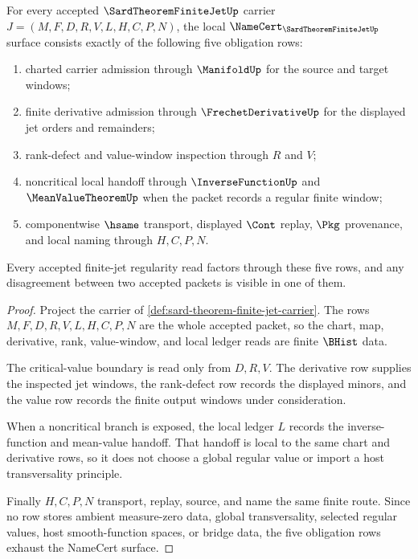 \begin{theorem}
\label{thm:sard-theorem-finite-jet-namecert-obligations}
For every accepted $\SardTheoremFiniteJetUp$ carrier $J=(M,F,D,R,V,L,H,C,P,N)$, the local $\NameCert_{\SardTheoremFiniteJetUp}$ surface consists exactly of the following five obligation rows:
\begin{enumerate}
\item charted carrier admission through $\ManifoldUp$ for the source and target windows;
\item finite derivative admission through $\FrechetDerivativeUp$ for the displayed jet orders and remainders;
\item rank-defect and value-window inspection through $R$ and $V$;
\item noncritical local handoff through $\InverseFunctionUp$ and $\MeanValueTheoremUp$ when the packet records a regular finite window;
\item componentwise $\hsame$ transport, displayed $\Cont$ replay, $\Pkg$ provenance, and local naming through $H,C,P,N$.
\end{enumerate}
Every accepted finite-jet regularity read factors through these five rows, and any disagreement between two accepted packets is visible in one of them.
\end{theorem}
\begin{proof}
Project the carrier of \autoref{def:sard-theorem-finite-jet-carrier}. The rows $M,F,D,R,V,L,H,C,P,N$ are the whole accepted packet, so the chart, map, derivative, rank, value-window, and local ledger reads are finite $\BHist$ data.

The critical-value boundary is read only from $D,R,V$. The derivative row supplies the inspected jet windows, the rank-defect row records the displayed minors, and the value row records the finite output windows under consideration.

When a noncritical branch is exposed, the local ledger $L$ records the inverse-function and mean-value handoff. That handoff is local to the same chart and derivative rows, so it does not choose a global regular value or import a host transversality principle.

Finally $H,C,P,N$ transport, replay, source, and name the same finite route. Since no row stores ambient measure-zero data, global transversality, selected regular values, host smooth-function spaces, or bridge data, the five obligation rows exhaust the NameCert surface.
\end{proof}

